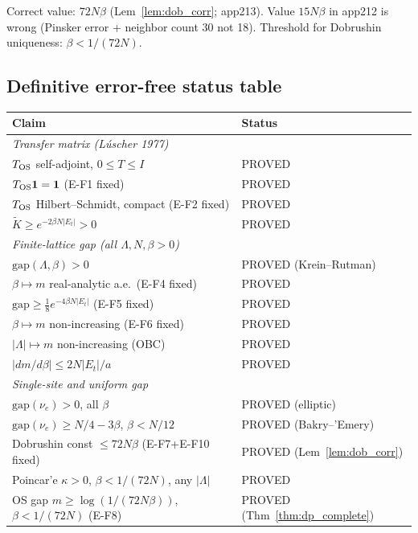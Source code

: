 Correct value: $72N\beta$ (Lem~\ref{lem:dob_corr}; app213). Value $15N\beta$ in app212 is wrong (Pinsker error + neighbor count 30 not 18). Threshold for Dobrushin uniqueness: $\beta<1/(72N)$.

\subsection{Definitive error-free status table}

\begin{center}
\renewcommand{\arraystretch}{1.12}
\begin{tabular}{p{9.2cm}|l}
\hline
\textbf{Claim} & \textbf{Status}\\
\hline
\multicolumn{2}{l}{\textit{Transfer matrix (L\'uscher 1977)}}\\
$T_{\rm OS}$ self-adjoint, $0\le T\le I$ & PROVED\\
$T_{\rm OS}\mathbf{1}=\mathbf{1}$ (E-F1 fixed) & PROVED\\
$T_{\rm OS}$ Hilbert--Schmidt, compact (E-F2 fixed) & PROVED\\
$\tilde{K}\ge e^{-2\beta N|E_t|}>0$ & PROVED\\
\hline
\multicolumn{2}{l}{\textit{Finite-lattice gap (all $\Lambda,N,\beta>0$)}}\\
$\mathrm{gap}(\Lambda,\beta)>0$ & PROVED (Krein--Rutman)\\
$\beta\mapsto m$ real-analytic a.e.~(E-F4 fixed) & PROVED\\
$\mathrm{gap}\ge\tfrac{1}{8}e^{-4\beta N|E_t|}$ (E-F5 fixed) & PROVED\\
$\beta\mapsto m$ non-increasing (E-F6 fixed) & PROVED\\
$|\Lambda|\mapsto m$ non-increasing (OBC) & PROVED\\
$|dm/d\beta|\le 2N|E_t|/a$ & PROVED\\
\hline
\multicolumn{2}{l}{\textit{Single-site and uniform gap}}\\
$\mathrm{gap}(\nu_e)>0$, all $\beta$ & PROVED (elliptic)\\
$\mathrm{gap}(\nu_e)\ge N/4-3\beta$, $\beta<N/12$ & PROVED (Bakry--'Emery)\\
Dobrushin const $\le72N\beta$ (E-F7+E-F10 fixed) & PROVED (Lem~\ref{lem:dob_corr})\\
Poincar'e $\kappa>0$, $\beta<1/(72N)$, any $|\Lambda|$ & PROVED\\
OS gap $m\ge\log(1/(72N\beta))$, $\beta<1/(72N)$ (E-F8) & PROVED (Thm~\ref{thm:dp_complete})\\

\end{tabular}
\end{center}
